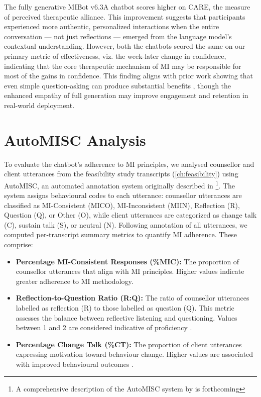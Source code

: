 The fully generative MIBot v6.3A chatbot scores higher on CARE, the measure of perceived therapeutic alliance. This improvement suggests that participants experienced more authentic, personalized interactions when the entire conversation --- not just reflections --- emerged from the language model's contextual understanding. However, both the chatbots scored the same on our primary metric of effectiveness, viz. the week-later change in confidence, indicating that the core therapeutic mechanism of MI may be responsible for most of the gains in confidence. This finding aligns with prior work showing that even simple question-asking can produce substantial benefits \citep{brown2023mi}, though the enhanced empathy of full generation may improve engagement and retention in real-world deployment.

\section{AutoMISC Analysis}
\label{sec:mi-adherence}

To evaluate the chatbot's adherence to MI principles, we analysed counsellor and client utterances from the feasibility study transcripts (\cref{ch:feasibility}) using AutoMISC, an automated annotation system originally described in \citet{mahmood-etal-2025-fully}\footnote{A comprehensive description of the AutoMISC system by \citet{ali2025automated} is forthcoming}.
The system assigns behavioural codes to each utterance: counsellor utterances are classified as MI-Consistent (MICO), MI-Inconsistent (MIIN), Reflection (R), Question (Q), or Other (O), while client utterances are categorized as change talk (C), sustain talk (S), or neutral (N). Following annotation of all utterances, we computed per-transcript summary metrics to quantify MI adherence. These comprise:

\begin{itemize}

    \item \textbf{Percentage MI-Consistent Responses (\%MIC):} The proportion of counsellor utterances that align with MI principles. Higher values indicate greater adherence to MI methodology.
    
    \item \textbf{Reflection-to-Question Ratio (R:Q):} The ratio of counsellor utterances labelled as reflection (R) to those labelled as question (Q). This metric assesses the balance between reflective listening and questioning. Values between 1 and 2 are considered indicative of proficiency \citep{moyers2016miti}.

    \item \textbf{Percentage Change Talk (\%CT):} The proportion of client utterances expressing motivation toward behaviour change. Higher values are associated with improved behavioural outcomes \citep{apodaca2009}.

\end{itemize}

